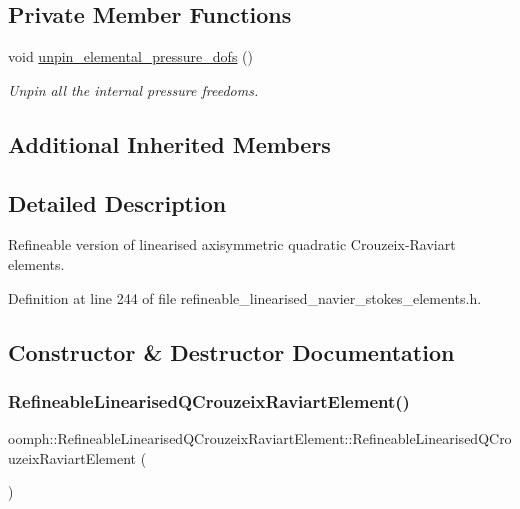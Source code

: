 \subsection*{Private Member Functions}
\begin{DoxyCompactItemize}
\item 
void \hyperlink{classoomph_1_1RefineableLinearisedQCrouzeixRaviartElement_a9d591ec2c270582b5541d0d0767035a5}{unpin\+\_\+elemental\+\_\+pressure\+\_\+dofs} ()
\begin{DoxyCompactList}\small\item\em Unpin all the internal pressure freedoms. \end{DoxyCompactList}\end{DoxyCompactItemize}
\subsection*{Additional Inherited Members}


\subsection{Detailed Description}
Refineable version of linearised axisymmetric quadratic Crouzeix-\/\+Raviart elements. 

Definition at line 244 of file refineable\+\_\+linearised\+\_\+navier\+\_\+stokes\+\_\+elements.\+h.



\subsection{Constructor \& Destructor Documentation}
\mbox{\label{classoomph_1_1RefineableLinearisedQCrouzeixRaviartElement_a2bc225f36b9b559fa4e6101914ed029a}} 
\subsubsection{\texorpdfstring{Refineable\+Linearised\+Q\+Crouzeix\+Raviart\+Element()}{RefineableLinearisedQCrouzeixRaviartElement()}}
{\footnotesize\ttfamily oomph\+::\+Refineable\+Linearised\+Q\+Crouzeix\+Raviart\+Element\+::\+Refineable\+Linearised\+Q\+Crouzeix\+Raviart\+Element (\begin{DoxyParamCaption}{ }\end{DoxyParamCaption})\hspace{0.3cm}{\ttfamily [inline]}}



